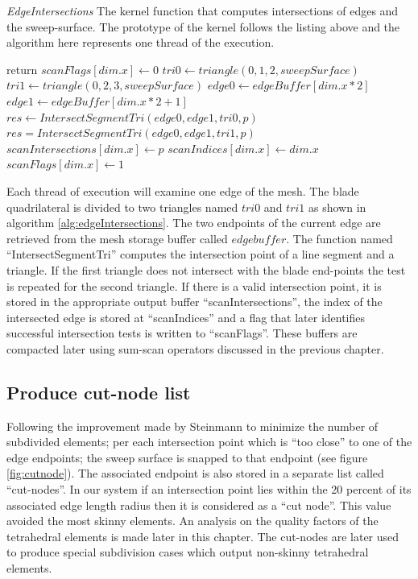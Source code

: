 \begin{algorithm}[H]
\caption{\textit{EdgeIntersections} The kernel function that computes intersections of edges 
and the sweep-surface. The prototype of the kernel follows the listing above and the algorithm here represents one 
thread of the execution. }
\label{alg:edgeIntersections}
\begin{algorithmic}[1]	
  \STATE return
  \ENDIF
  \STATE $scanFlags[dim.x] \gets 0$
  \STATE $tri0 \gets triangle(0, 1, 2, sweepSurface)$
  \STATE $tri1 \gets triangle(0, 2, 3, sweepSurface)$
  \STATE $edge0 \gets edgeBuffer[dim.x * 2]$
  \STATE $edge1 \gets edgeBuffer[dim.x * 2 + 1]$
  \STATE $res \gets IntersectSegmentTri(edge0, edge1, tri0, p)$
  \STATE $res = IntersectSegmentTri(edge0, edge1, tri1, p)$
  \ENDIF
  \STATE $scanIntersections[dim.x] \gets p$
  \STATE $scanIndices[dim.x] \gets dim.x$
  \STATE $scanFlags[dim.x] \gets 1$
  \ENDIF
  
\end{algorithmic}
\end{algorithm}

Each thread of execution will examine one edge of the mesh. The blade quadrilateral is divided to two triangles named $tri0$ and $tri1$ 
as shown in algorithm \ref{alg:edgeIntersections}. The two endpoints of the current edge are retrieved from the mesh storage buffer called 
$edgebuffer$. The function named ``IntersectSegmentTri'' computes the intersection point of a line segment and a triangle. If the
first triangle does not intersect with the blade end-points the test is repeated for the second triangle. If there is a
valid intersection point, it is stored in the appropriate output buffer ``scanIntersections'', the index of the intersected edge is stored at
``scanIndices'' and a flag that later identifies successful intersection tests is written to ``scanFlags''. These buffers are compacted later 
using sum-scan operators discussed in the previous chapter. 


\subsection{Produce cut-node list}
\label{sec:CuttingProduceCutNodeList}
Following the improvement made by Steinmann \etal \cite{Steinemann} to minimize the number of subdivided elements; 
per each intersection point which is ``too close'' to one of the edge endpoints; 
the sweep surface is snapped to that endpoint (see figure \ref{fig:cutnode}). The associated endpoint is also stored in a separate list called ``cut-nodes''. 
In our system if an intersection point lies within the 20 percent of its associated edge length radius then it is considered 
as a ``cut node''. This value avoided the most skinny elements. An analysis on the quality factors of the tetrahedral elements 
is made later in this chapter. The cut-nodes are later used to produce special subdivision cases which output non-skinny 
tetrahedral elements.

